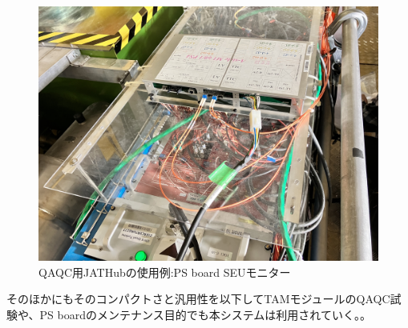 \begin{figure} 
\centering
\includegraphics[width=16cm]{fig/JATHubSEU.JPG}
\caption[QAQC用JATHubの使用例:PS board SEUモニター]{QAQC用JATHubの使用例:PS board SEUモニター\cite{mt_hashimoto}}
\label{JATHubSEU}
\end{figure}

そのほかにもそのコンパクトさと汎用性を以下してTAMモジュールのQAQC試験や、PS boardのメンテナンス目的でも本システムは利用されていく。。